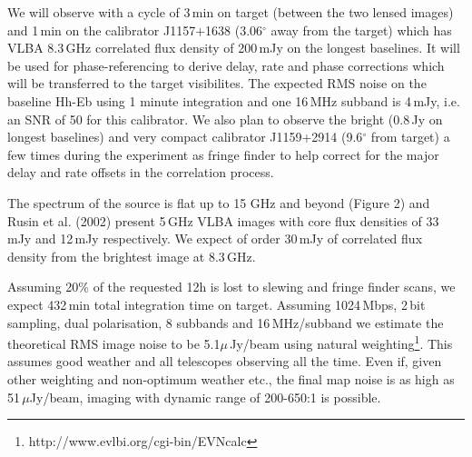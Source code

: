 \documentclass[a4paper, 11pt]{article}
\begin{document}
We will observe with a cycle of 3\,min on target (between the two lensed images) and 1\,min on the calibrator J1157+1638 (3.06$^\circ$ away from the target) which has VLBA 8.3\,GHz correlated flux density of 200\,mJy on the longest baselines. It will be used for phase-referencing to derive delay, rate and phase corrections which will be transferred to the target visibilites. The expected RMS noise on the baseline Hh-Eb using 1 minute integration and one 16\,MHz subband is 4\,mJy, i.e. an SNR of 50 for this calibrator.
We also plan to observe the bright (0.8\,Jy on longest baselines) and very compact calibrator J1159+2914 (9.6$^\circ$ from target) a few times during the experiment as fringe finder to help correct for the major delay and rate offsets in the correlation process.

The spectrum of the source is flat up to 15 GHz and beyond (Figure 2) and Rusin et al. (2002) present 5\,GHz VLBA images with core flux densities of 33\,mJy and 12\,mJy respectively. We expect of order 30\,mJy of correlated flux density from the brightest image at 8.3\,GHz. 

Assuming 20\% of the requested 12h is lost to slewing and fringe finder scans, we expect 432\,min total integration time on target. Assuming 1024\,Mbps, 2\,bit sampling, dual polarisation, 8 subbands and 16\,MHz/subband we estimate the theoretical RMS image noise to be 5.1$\mu$\,Jy/beam using natural weighting\footnote{http://www.evlbi.org/cgi-bin/EVNcalc}. This assumes good weather and all telescopes observing all the time. Even if, given other weighting and non-optimum weather etc., the final map noise is as high as 51\,$\mu$Jy/beam, imaging with dynamic range of 200-650:1 is possible.

\end{document}
